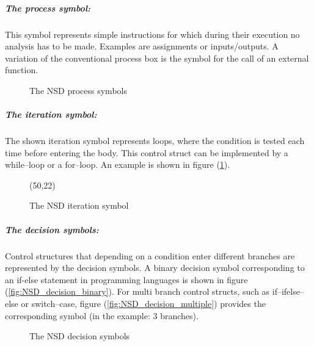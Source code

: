 \documentclass{report}
\begin{document}
\subparagraph{The process symbol:}

This symbol represents simple instructions for which during their execution no analysis has to be made. Examples are assignments or inputs/outputs. 
A variation of the conventional process box is the symbol for the call of an external function.
\begin{figure}
\centering
{}
\caption{The NSD process symbols }
\end{figure}

\subparagraph{The iteration symbol:}
The shown iteration symbol represents loops, where the condition is tested each time before entering the body. This control struct can be implemented by a while--loop or a for--loop. An example is shown in figure (\ref{NSD_whileLoop}).

\begin{figure}[H]
\centering
\label{NSD_whileLoop}
\begin{struktogramm}(50,22)
\whileend
\end{struktogramm}

\caption{The NSD iteration symbol}
\end{figure}

\subparagraph{The decision symbols:}
Control structures that depending on a condition enter different branches are represented by the decision symbols. A binary decision symbol corresponding to an if-else statement in programming languages is shown in figure (\ref{fig:NSD_decision_binary}). For multi branch control structs, such as if--ifelse--else or switch--case, figure (\ref{fig:NSD_decision_multiple}) provides the corresponding symbol (in the example: 3 branches).
 
\begin{figure}[H]
\centering
{}
\caption{The NSD decision symbols }
\end{figure}
\end{document}
